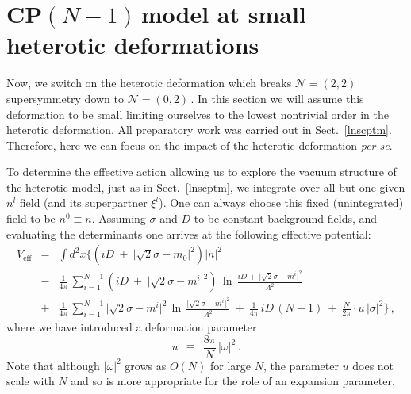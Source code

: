 \documentclass[epsfig,12pt]{article}
\def\beq{\begin{equation}}
\def\eeq{\end{equation}}
\def\beqn{\begin{eqnarray}}
\def\eeqn{\end{eqnarray}}
\newcommand{\ntt}{${\mathcal N}=(2,2)\,$}
\newcommand{\nzt}{${\mathcal N}=(0,2)\,$}
\newcommand{\cpn}{CP$(N-1)\,$}
\def\beqn{\begin{eqnarray}}
\def\eeqn{\end{eqnarray}}
\def\beq{\begin{equation}}
\def\eeq{\end{equation}}
\begin{document}
{\section{\cpn model at small heterotic  deformations}
\label{hecpnsm}
\setcounter{equation}{0}

Now, we switch on the heterotic deformation which breaks \ntt\, supersymmetry down to \nzt\!.
In this section we will assume this deformation to be small limiting ourselves to the lowest
nontrivial order in the heterotic deformation. All preparatory work was carried out in Sect.~\ref{lnscptm}.
Therefore, here we can focus on the impact of the heterotic deformation {\em per se}.

To determine the effective action allowing us to explore the vacuum structure of the
heterotic
model, just as in Sect.~\ref{lnscptm}, we integrate over all but one given $ n^l $ field (and its superpartner $ \xi^l $).
One can always choose this fixed (unintegrated) field to be   $n^0\equiv n$.
Assuming $\sigma$ and $D$ to be constant background fields,
and  evaluating the determinants
one arrives at the following effective potential:
\beqn
	V_\text{eff} & =& \int d^2x 
		\biggl\{  \left( iD ~+~ \bigl|\sqrt{2}\sigma -  m_0 \bigr|^2 \right) |n|^2 
	\nonumber\\[4mm]
	&-& 
	\frac{1}{4\pi}\, \sum_{i=1}^{N-1} \left( iD ~+~ \bigl|\sqrt{2}\sigma -  m^i \bigr|^2 \right)\,
		\ln\, \frac{ iD \,+\, \bigl| \sqrt{2}\sigma - m^i \bigr|^2} {\Lambda^2}
\label{Veff}
\\[4mm]
	&+&
	\frac{1}{4\pi}\, \sum_{i=1}^{N-1} \bigl|\sqrt{2}\sigma - m^i \bigr|^2\,
			\ln\, \frac{ \bigl| \sqrt{2}\sigma - m^i \bigr|^2 } { \Lambda^2 }
	~+~
	\frac{1}{4\pi}\, iD\, (N-1) 
	~+~
	\frac{N}{2\pi} \cdot u\, \bigl|\sigma\bigr|^2 \biggr\} \,,
	\nonumber
\eeqn
where we have introduced a deformation parameter
 \beq
u ~~\equiv~~ \frac{8\pi}{N}\,|\omega|^2 \,.
\label{u}
\eeq	
Note that although $ |\omega|^2 $ grows as $ O(N) $ for large $N$, the parameter $u$ 
does not scale with $N$ and so is more appropriate for the r{o}le of an expansion parameter. 

}
\end{document}
